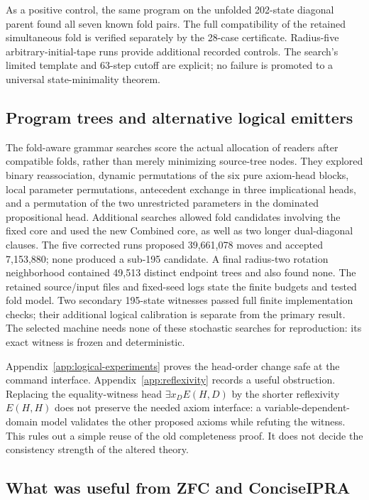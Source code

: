 As a positive control, the same program on the unfolded 202-state diagonal
parent found all seven known fold pairs. The full compatibility of the
retained simultaneous fold is verified separately by the 28-case
certificate. Radius-five arbitrary-initial-tape runs provide additional
recorded controls. The search's limited template and 63-step cutoff are
explicit; no failure is promoted to a universal state-minimality theorem.

\subsection{Program trees and alternative logical emitters}

The fold-aware grammar searches score the actual allocation of readers
after compatible folds, rather than merely minimizing source-tree nodes.
They explored binary reassociation, dynamic permutations of the six pure
axiom-head blocks, local parameter permutations, antecedent exchange in
three implicational heads, and a permutation of the two unrestricted
parameters in the dominated propositional head. Additional searches
allowed fold candidates involving the fixed core and used the new
Combined core, as well as two longer dual-diagonal clauses.
The five corrected runs proposed 39,661,078 moves and accepted 7,153,880;
none produced a sub-195 candidate. A final radius-two rotation neighborhood
contained 49,513 distinct endpoint trees and also found none. The retained
source/input files and fixed-seed logs state the finite budgets and tested
fold model. Two secondary 195-state witnesses passed full finite
implementation checks; their additional logical calibration is separate
from the primary result. The selected machine needs none of these
stochastic searches for reproduction: its exact witness is frozen and
deterministic.

Appendix~\ref{app:logical-experiments} proves the head-order change safe at
the command interface. Appendix~\ref{app:reflexivity} records a useful obstruction. Replacing the equality-witness head
$\exists x_D E(H,D)$ by the shorter reflexivity $E(H,H)$ does not preserve
the needed axiom interface: a variable-dependent-domain model validates the
other proposed axioms while refuting the witness. This rules out a simple
reuse of the old completeness proof. It does not decide the consistency
strength of the altered theory.

\subsection{What was useful from ZFC and ConciseIPRA}


